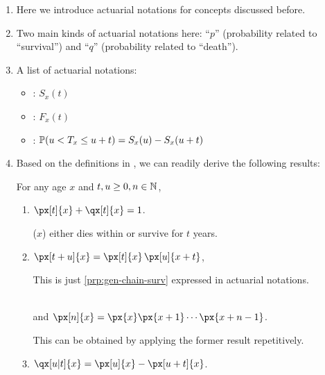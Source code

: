 \begin{enumerate}
\item Here we introduce actuarial notations for concepts discussed before.
\item Two main kinds of actuarial notations here: ``\(p\)'' (probability
related to ``survival'') and ``\(q\)'' (probability related to ``death'').
\item \label{it:actuar-pq} A list of actuarial notations:
\begin{itemize}
\item {}: \(S_x(t)\)
\item {}: \(F_x(t)\)
\item {}: \(\mathbb{P}\qty(u<T_x\le u+t)=S_x(u)-S_x(u+t)\)
\end{itemize}

\item Based on the definitions in , we can readily
derive the following results:
\begin{proposition}
\label{prp:act-notation-prop}
For any age \(x\) and \(t,u\ge 0, n\in\mathbb{N}\),
\begin{enumerate}
\item \(\px[t]{x}+\qx[t]{x}=1\).
\begin{intuition}
(\(x\)) either dies within or survive for \(t\) years.
\end{intuition}
\item \(\px[t+u]{x}=\px[t]{x}\,\px[u]{x+t}\),
\begin{note}
This is just \cref{prp:gen-chain-surv} expressed in actuarial notations.\
\end{note}\\
and
\(\px[n]{x}=\px{x}\px{x+1}\cdots\px{x+n-1}\).
\begin{note}
This can be obtained by applying the former result repetitively.
\end{note}
\item \(\qx[u|t]{x}=\px[u]{x}-\px[u+t]{x}\).
\begin{intuition}


\end{intuition}
\end{enumerate}
\end{proposition}
\end{enumerate}
